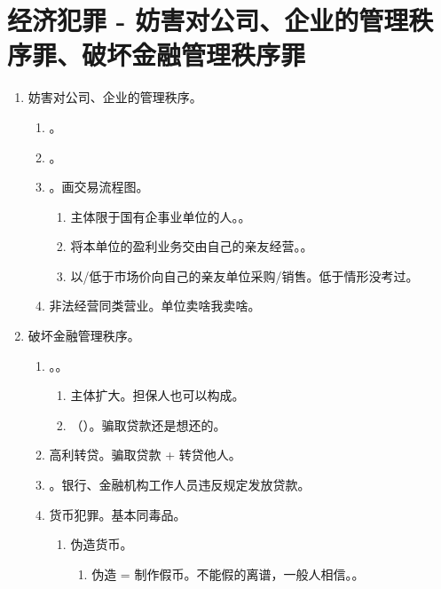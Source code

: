 \section{经济犯罪 - 妨害对公司、企业的管理秩序罪、破坏金融管理秩序罪}
\begin{enumerate}
  \item 妨害对公司、企业的管理秩序。
        \begin{enumerate}
          \item {}。
          \item {}。
          \item {}。画交易流程图。
                \begin{enumerate}
                  \item 主体限于国有企事业单位的人。。
                  \item 将本单位的盈利业务交由自己的亲友经营。。
                  \item 以/低于市场价向自己的亲友单位采购/销售。低于情形没考过。
                \end{enumerate}
          \item 非法经营同类营业。单位卖啥我卖啥。
        \end{enumerate}
  \item 破坏金融管理秩序。
        \begin{enumerate}
          \item {}。。
                \begin{enumerate}
                  \item 主体扩大。担保人也可以构成。
                  \item {}（）。骗取贷款还是想还的。
                \end{enumerate}
          \item 高利转贷。骗取贷款 + 转贷他人。
          \item {}。银行、金融机构工作人员违反规定发放贷款。
          \item 货币犯罪。基本同毒品。
                \begin{enumerate}
                  \item 伪造货币。
                        \begin{enumerate}
                          \item 伪造 = 制作假币。不能假的离谱，一般人相信。。

\end{enumerate}
\end{enumerate}
\end{enumerate}
\end{enumerate}
